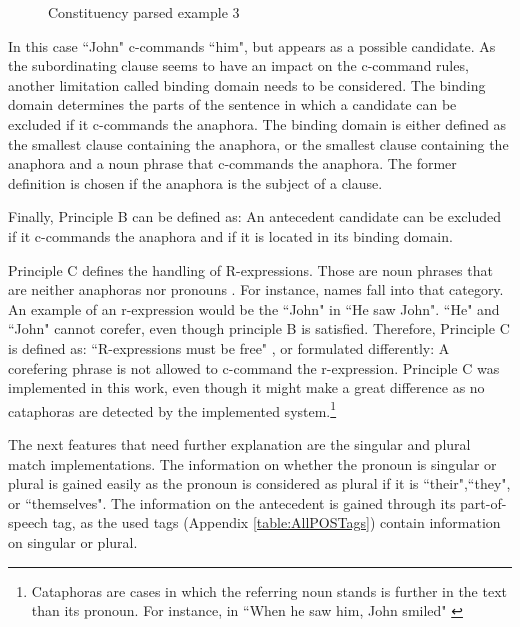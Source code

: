 \begin{figure}[h]
    \centering\sffamily
{}
    \caption{Constituency parsed example 3}%
    \label{fig:ExampleTreeThree}%
\end{figure}

In this case ``John" c-commands ``him", but appears as a possible candidate. As the subordinating clause seems to have an impact on the c-command rules, another limitation called binding domain needs to be considered. The binding domain determines the parts of the sentence in which a candidate can be excluded if it c-commands the anaphora. The binding domain is either defined as the smallest clause containing the anaphora, or the smallest clause containing the anaphora and a noun phrase that c-commands the anaphora. The former definition is chosen if the anaphora is the subject of a clause. 

Finally, Principle B can be defined as: An antecedent candidate can be excluded if it c-commands the anaphora and if it is located in its binding domain.

Principle C defines the handling of R-expressions. Those are noun phrases that are neither anaphoras nor pronouns \citep{crystal2011dictionary}. For instance, names fall into that category. An example of an r-expression would be the ``John" in ``He saw John". ``He" and ``John" cannot corefer, even though principle B is satisfied. Therefore, Principle C is defined as: ``R-expressions must be free" \citep{chomsky1993lectures}, or formulated differently: A corefering phrase is not allowed to c-command the r-expression. Principle C was implemented in this work, even though it might make a great difference as no cataphoras are detected by the implemented system.\footnote{Cataphoras are cases in which the referring noun stands is further in the text than its pronoun. For instance, in ``When he saw him, John smiled" \citep[p. 10]{cutting2005pragmatics}}

The next features that need further explanation are the singular and plural match implementations. The information on whether the pronoun is singular or plural is gained easily as the pronoun is considered as plural if it is ``their",``they", or ``themselves". The information on the antecedent is gained through its part-of-speech tag, as the used tags (Appendix \ref{table:AllPOSTags}) contain information on singular or plural.

